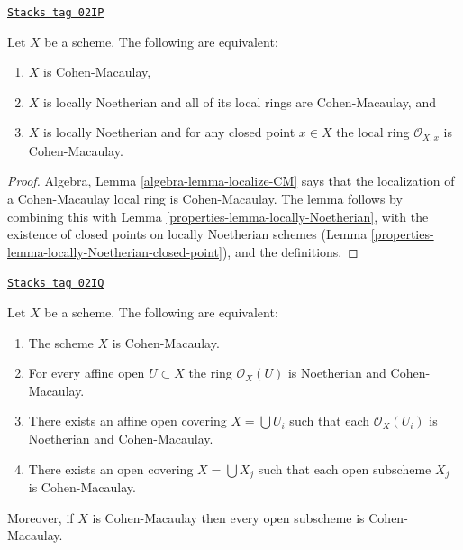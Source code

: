 \begin{lemma}
\label{properties-lemma-characterize-Cohen-Macaulay}
\href{https://stacks.math.columbia.edu/tag/02IP}{\texttt{Stacks tag 02IP}}

Let $X$ be a scheme. The following are equivalent:
\begin{enumerate}
\item $X$ is Cohen-Macaulay,
\item $X$ is locally Noetherian and all of its local rings are Cohen-Macaulay,
and
\item $X$ is locally Noetherian and for any closed point $x \in X$
the local ring $\mathcal{O}_{X, x}$ is Cohen-Macaulay.
\end{enumerate}
\end{lemma}

\begin{proof}

Algebra, Lemma \ref{algebra-lemma-localize-CM} says that the localization of
a Cohen-Macaulay local ring is Cohen-Macaulay. The lemma follows
by combining this with Lemma \ref{properties-lemma-locally-Noetherian},
with the existence of closed
points on locally Noetherian schemes
(Lemma \ref{properties-lemma-locally-Noetherian-closed-point}), and
the definitions.
\end{proof}

\begin{lemma}
\label{properties-lemma-locally-Cohen-Macaulay}
\href{https://stacks.math.columbia.edu/tag/02IQ}{\texttt{Stacks tag 02IQ}}

Let $X$ be a scheme. The following are equivalent:
\begin{enumerate}
\item The scheme $X$ is Cohen-Macaulay.
\item For every affine open $U \subset X$ the ring $\mathcal{O}_X(U)$
is Noetherian and Cohen-Macaulay.
\item There exists an affine open covering $X = \bigcup U_i$ such that
each $\mathcal{O}_X(U_i)$ is Noetherian and Cohen-Macaulay.
\item There exists an open covering $X = \bigcup X_j$
such that each open subscheme $X_j$ is Cohen-Macaulay.
\end{enumerate}
Moreover, if $X$ is Cohen-Macaulay then every open subscheme
is Cohen-Macaulay.
\end{lemma}

